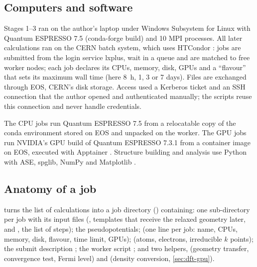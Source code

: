 \subsection{Computers and software}
\label{sec:dft-cern}

Stages 1--3 ran on the author's laptop under Windows Subsystem for Linux with Quantum ESPRESSO 7.5 (conda-forge build)
and 10 MPI processes. All later calculations ran on the CERN batch system, which uses HTCondor \citep{Thain2005}: jobs
are submitted from the login service lxplus, wait in a queue and are matched to free worker nodes; each job declares its
CPUs, memory, disk, GPUs and a ``flavour'' that sets its maximum wall time (here 8~h, 1, 3 or 7 days). Files are
exchanged through EOS, CERN's disk storage. Access used a Kerberos ticket and an SSH connection that the author opened
and authenticated manually; the scripts reuse this connection and never handle credentials.

The CPU jobs run Quantum ESPRESSO 7.5 from a relocatable copy of the conda environment stored on EOS and unpacked on the
worker. The GPU jobs run NVIDIA's GPU build of Quantum ESPRESSO 7.3.1 \citep{NvidiaQE} from a container image on EOS,
executed with Apptainer \citep{Kurtzer2017}. Structure building and analysis use Python with ASE, spglib, NumPy
\citep{Harris2020} and Matplotlib \citep{Hunter2007}.

\subsection{Anatomy of a job}
\label{sec:dft-driver}

 turns the list of calculations into a job directory () containing: one
sub-directory per job with its input files (, templates  that receive the relaxed geometry
later, and , the list of steps); the pseudopotentials;  (one line per job: name, CPUs,
memory, disk, flavour, time limit, GPUs);  (atoms, electrons, irreducible $k$ points); the submit
description ; the worker script ; and two helpers,  (geometry transfer,
convergence test, Fermi level) and  (density conversion, \cref{sec:dft-gpu}).

